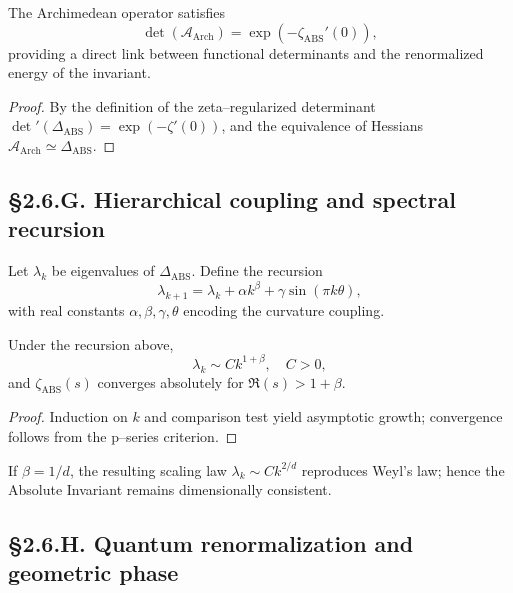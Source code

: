\begin{theorem}\label{thm:2.6.id}
The Archimedean operator satisfies
\[
\det(\mathcal{A}_{\mathrm{Arch}})=\exp(-\zeta_{\mathrm{ABS}}'(0)),
\]
providing a direct link between functional determinants and the renormalized energy of the invariant.
\end{theorem}

\begin{proof}
By the definition of the zeta–regularized determinant $\det'(\Delta_{\mathrm{ABS}})=\exp(-\zeta'(0))$, and the equivalence of Hessians $\mathcal{A}_{\mathrm{Arch}}\simeq\Delta_{\mathrm{ABS}}$.
\end{proof}

\subsection*{§2.6.G. Hierarchical coupling and spectral recursion}

\begin{definition}
Let $\lambda_k$ be eigenvalues of $\Delta_{\mathrm{ABS}}$.  
Define the recursion
\[
\lambda_{k+1}=\lambda_k+\alpha k^\beta+\gamma \sin(\pi k \theta),
\]
with real constants $\alpha,\beta,\gamma,\theta$ encoding the curvature coupling.
\]
\end{definition}

\begin{theorem}\label{thm:2.6.rec}
Under the recursion above,
\[
\lambda_k\sim C k^{1+\beta},\quad C>0,
\]
and $\zeta_{\mathrm{ABS}}(s)$ converges absolutely for $\Re(s)>1+\beta$.
\end{theorem}

\begin{proof}
Induction on $k$ and comparison test yield asymptotic growth; convergence follows from the p–series criterion.
\end{proof}

\begin{corollary}
If $\beta=1/d$, the resulting scaling law $\lambda_k\sim C k^{2/d}$ reproduces Weyl’s law; hence the Absolute Invariant remains dimensionally consistent.
\end{corollary}

\subsection*{§2.6.H. Quantum renormalization and geometric phase}


